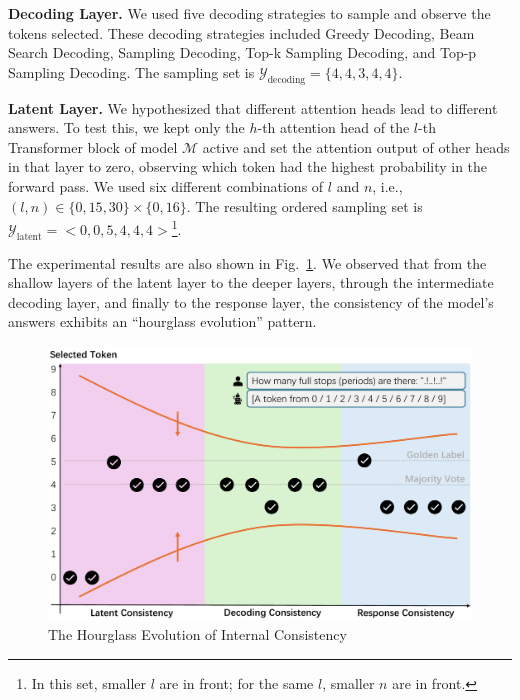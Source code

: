 \documentclass[lettersize,journal]{IEEEtran}
\begin{document}
\textbf{Decoding Layer.} We used five decoding strategies to sample and observe the tokens selected. These decoding strategies included Greedy Decoding, Beam Search Decoding, Sampling Decoding, Top-k Sampling Decoding, and Top-p Sampling Decoding. The sampling set is $\mathcal{Y}_\text{decoding} = \{ 4,4,3,4,4 \}$.

\textbf{Latent Layer.} We hypothesized that different attention heads lead to different answers. To test this, we kept only the $h$-th attention head of the $l$-th Transformer block of model $\mathcal{M}$ active and set the attention output of other heads in that layer to zero, observing which token had the highest probability in the forward pass. We used six different combinations of $l$ and $n$, i.e., $(l,n) \in \{0, 15, 30\} \times \{0, 16\}$. The resulting ordered sampling set is $\mathcal{Y}_\text{latent} = < 0,0,5,4,4,4 >$\footnote{In this set, smaller $l$ are in front; for the same $l$, smaller $n$ are in front.}.

The experimental results are also shown in Fig.~\ref{fig:expt}. We observed that from the shallow layers of the latent layer to the deeper layers, through the intermediate decoding layer, and finally to the response layer, the consistency of the model's answers exhibits an ``hourglass evolution'' pattern.

\begin{figure}[t!]
    \centering
    \includegraphics[width=\linewidth]{figures/inconsistency.pdf}
    \caption{The Hourglass Evolution of Internal Consistency}
    \label{fig:expt}
\end{figure}
\end{document}
